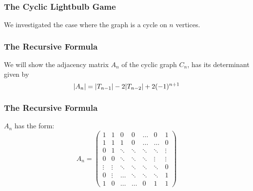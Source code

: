 \documentclass{beamer}
\newcommand{\off}{white}
\DeclarePairedDelimiter\abs{\lvert}{\rvert}%
\begin{document}
\begin{frame}
    \frametitle{The Cyclic Lightbulb Game}
    We investigated the case where the graph is a cycle on $n$ vertices.

\begin{figure}[!h]
    \centering
\end{figure}
\end{frame}


\begin{frame}
\frametitle{The Recursive Formula}

We will show the adjacency matrix $A_n$ of the cyclic graph $C_n$, has its determinant
given by
\[
    \abs{A_n} = \abs{T_{n-1}} - 2\abs{T_{n-2}} + 2(-1)^{n+1}
\]
\end{frame}

\begin{frame}
\frametitle{The Recursive Formula}
    $A_n$ has the form:
    \[
        A_n=
        \begin{pmatrix}
            1 & 1 & 0 & 0 & \dots & 0 & 1\\
            1 & 1 & 1 & 0 & \dots & \dots & 0\\
            0 & 1 & \ddots & \ddots & \ddots & \ddots & \vdots\\
            0 & 0 & \ddots & \ddots & \ddots & \vdots & \vdots\\
            \vdots & \vdots & \ddots & \ddots & \ddots & \ddots & 0\\
            0 & \vdots & \dots & \ddots & \ddots & \ddots & 1\\
            1 & 0 & \dots & \dots & 0 & 1 & 1
        \end{pmatrix}
    \]
\end{frame}
\end{document}
